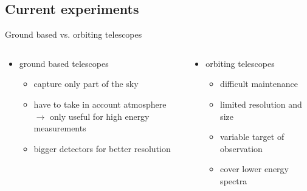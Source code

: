 \documentclass[11pt,a4paper,titlepage]{beamer}
\begin{document}
\subsection{Current experiments}
\begin{frame}{Ground based vs. orbiting telescopes}
\begin{columns}[T]
\begin{column}{0.49\textwidth}
\begin{itemize}
\item ground based telescopes
\begin{itemize}
\item capture only part of the sky\medskip
\item have to take in account atmosphere\\
$\rightarrow$ only useful for high energy measurements\medskip
\item bigger detectors for better resolution
\end{itemize}
\end{itemize}
\hspace{1cm}%
\end{column}
\begin{column}{0.49\textwidth}
\begin{itemize}
\item orbiting telescopes
\begin{itemize}
\item difficult maintenance\medskip
\item limited resolution and size\medskip
\item variable target of observation\medskip
\item cover lower energy spectra
\end{itemize}
\end{itemize}
\vspace{0.3cm}
\hspace{0.1cm}%
\end{column}
\end{columns}
\end{frame}
\end{document}
